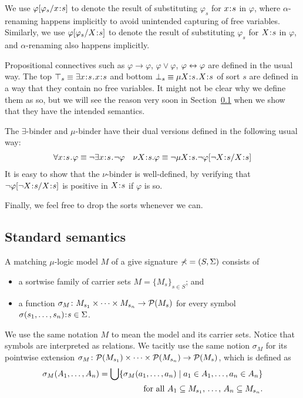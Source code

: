 \documentclass{amsart}
\begin{document}
We use $\varphi[\varphi_s / x \mathbin{\!:\!} s]$ to denote
the result of substituting $\varphi_s$ for $x \mathbin{\!:\!} s$
in $\varphi$, where $\alpha$-renaming happens implicitly to avoid
unintended capturing of free variables. 
Similarly, we use $\varphi[\varphi_s / X \mathbin{\!:\!} s]$ to denote
the result of substituting $\varphi_s$ for $X \mathbin{\!:\!} s$
in $\varphi$, and $\alpha$-renaming also happens implicitly.

Propositional connectives
such as $\varphi \to \varphi$, $\varphi \vee \varphi$,
$\varphi \leftrightarrow \varphi$
are defined in the usual way.
The top $\top_s \equiv \exists x \mathbin{\!:\!} s \mathbin{\!.\!} x \mathbin{\!:\!} s$ 
and bottom $\bot_s \equiv \mu X \mathbin{\!:\!} s \mathbin{\!.\!} X \mathbin{\!:\!} s$ of sort $s$
are defined in a way that they contain no free variables.  
It might not be clear why we define them as so,
but we will see the reason very soon in Section~\ref{sec:standard_semantics}
when we show that they have the intended semantics.

The $\exists$-binder and $\mu$-binder have their
dual versions defined in the following usual way:
\begin{align*}
\forall x \cln s \ldot \varphi \equiv \neg \exists x \cln s \ldot \neg \varphi
&&
\nu X \cln s . \varphi \equiv \neg \mu X \cln s . \neg \varphi[\neg X \cln s / X \cln s]
\end{align*}
It is easy to show that the $\nu$-binder
is well-defined, by verifying that $\neg \varphi[\neg X \mathbin{\!:\!} s / X \mathbin{\!:\!} s]$ is positive in
$X \mathbin{\!:\!} s$ if $\varphi$ is so.

Finally, we feel free to drop the sorts whenever we can.


\subsection{Standard semantics}
\label{sec:standard_semantics}

\begin{definition}
A matching $\mu$-logic model $M$ of a give signature $\mathbb{\Sigma} = (S, \Sigma)$
consists of
\begin{itemize}
\item a sortwise family of carrier sets $M = \{M_s\}_{s \in S}$; and
\item a function 
$\sigma_M \colon M_{s_1} \times \dots \times M_{s_n} \to \mathcal{P}(M_s)$
for every symbol $\sigma(s_1,\dots,s_n) \mathbin{\!:\!} s \in \Sigma$.
\end{itemize}
\end{definition}
We use the same notation $M$ to mean the model and its carrier sets. 
Notice that symbols are interpreted as relations. 
We tacitly use the same notion $\sigma_M$ for its
pointwise extension 
$\sigma_M \colon \mathcal{P}(M_{s_1}) \times \dots \times \mathcal{P}(M_{s_n}) 
\to \mathcal{P}(M_s)$, which is defined as
\begin{align}
\label{eq:pointwise_extension}
\sigma_M(A_1,\dots,A_n) = \bigcup 
\{ \sigma_M(a_1,\dots,a_n) \mid  
a_1 \in A_1, \dots, a_n \in A_n
\}\\
\quad \text{for all $A_1 \subseteq M_{s_1}$, \dots, $A_n \subseteq M_{s_n}$}.
\end{align}
\end{document}
